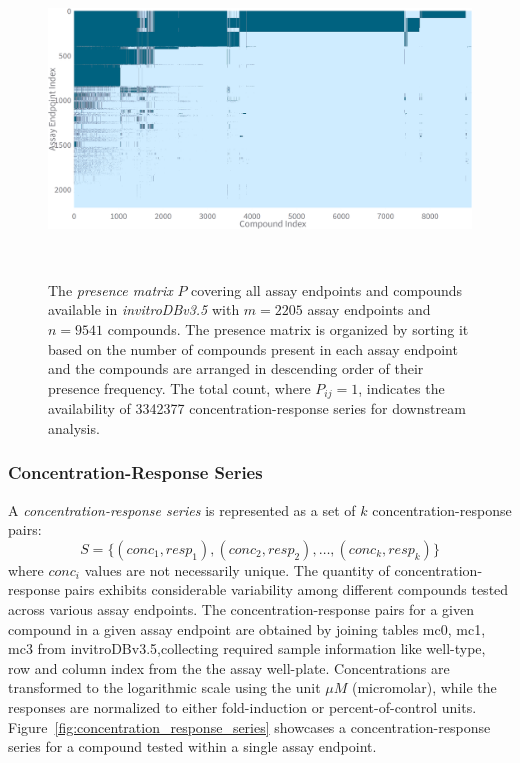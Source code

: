 \begin{figure}[h]  %
    \centering
    \includegraphics[width=1.0\textwidth]{figures/presence_matrix_all.png}  
    \caption{The \emph{presence matrix} $P$ covering all assay endpoints and compounds available in \textit{invitroDBv3.5} with $m = \num{2205}$ assay endpoints and $n = \num{9541}$ compounds. The presence matrix is organized by sorting it based on the number of compounds present in each assay endpoint and the compounds are arranged in descending order of their presence frequency. The total count, where $P_{ij} = 1$, indicates the availability of \num{3342377} concentration-response series for downstream analysis.}
~\label{fig:presence_matrix_all} 
\end{figure}


\subsubsection{Concentration-Response Series}
A \textit{concentration-response series} is represented as a set of $k$ concentration-response pairs: 
\[ S = \{(conc_1, resp_1), (conc_2, resp_2), \dots, (conc_k, resp_k)\} \]
where $conc_i$ values are not necessarily unique. The quantity of concentration-response pairs exhibits considerable variability among different compounds tested across various assay endpoints.
The concentration-response pairs for a given compound in a given assay endpoint are obtained by joining tables mc0, mc1, mc3 from invitroDBv3.5,collecting required sample information like well-type, row and column index from the the assay well-plate.
Concentrations are transformed to the logarithmic scale using the unit $\mu M$ (micromolar), while the responses are normalized to either fold-induction or percent-of-control units.
Figure~\ref{fig:concentration_response_series} showcases a concentration-response series for a compound tested within a single assay endpoint.

